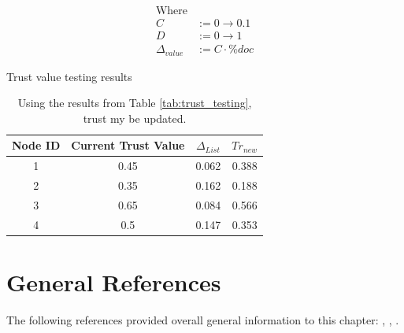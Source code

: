 \begin{table}[h!]
\begin{align*}
    \text{Where}& \\
    C &:= 0 \to 0.1 \\
    D &:= 0 \to 1 \\
    \Delta_{value} &:= C \cdot \%doc
\end{align*}
    \caption{Trust value testing results}
    \label{tab:trust_testing}
\end{table}

\begin{table}[h!]
    \centering
\begin{tabular}{c | c | c | c}
    \hline
    Node ID	& Current Trust Value &	\( \Delta_{List} \) & \( Tr_{new} \)\\
    \hline \hline
1       & 0.45                & 0.062    &    0.388 \\
2       & 0.35                & 0.162    &    0.188 \\
3       & 0.65                & 0.084    &    0.566 \\
4       & 0.5                 & 0.147    &    0.353 \\
\end{tabular}
\caption{Using the results from Table \ref{tab:trust_testing}, trust my be
updated.}
\label{tab:trust_evaulation}
\end{table}
\section{General References}
The following references provided overall general information to this chapter:
\autocite{JiminLi2010}, \autocite{Varadharajan2004},
\autocite{Varadharajan2005}.

